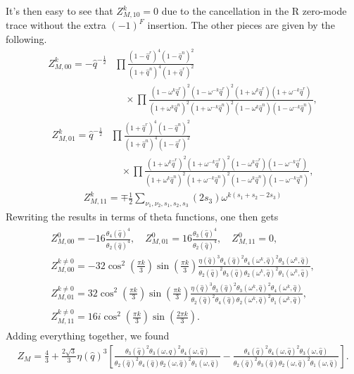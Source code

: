 \documentclass[12pt]{article}
\newcommand{\ie}{\begin{equation}\begin{aligned}}
\newcommand{\fe}{\end{aligned}\end{equation}}
\begin{document}
It's then easy to see that $Z_{M,10}^k=0$ due to the cancellation in the R zero-mode trace without the extra $(-1)^F$ insertion. The other pieces are given by the following.
\ie 
Z_{M,00}^k = -\hat{q}^{-\frac{1}{2}}&\prod \frac{(1-\hat{q}^r)^4(1-\hat{q}^n)^2}{(1+\hat{q}^n)^4(1+\hat{q}^r)^2}\\
&\quad \times \prod \frac{(1-\omega^k \hat{q}^r)^2(1-\omega^{-k} \hat{q}^r)^2(1+\omega^k \hat{q}^r)(1+\omega^{-k} \hat{q}^r)}{(1+\omega^k \hat{q}^n)^2(1+\omega^{-k} \hat{q}^n)^2(1-\omega^k \hat{q}^n)(1-\omega^{-k} \hat{q}^n)},
\fe
\ie
Z_{M,01}^k = \hat{q}^{-\frac{1}{2}}&\prod \frac{(1+\hat{q}^r)^4(1-\hat{q}^n)^2}{(1+\hat{q}^n)^4(1-\hat{q}^r)^2}\\
&\quad \times \prod \frac{(1+\omega^k \hat{q}^r)^2(1+\omega^{-k} \hat{q}^r)^2(1-\omega^k \hat{q}^r)(1-\omega^{-k} \hat{q}^r)}{(1+\omega^k \hat{q}^n)^2(1+\omega^{-k} \hat{q}^n)^2(1-\omega^k \hat{q}^n)(1-\omega^{-k} \hat{q}^n)},
\fe
\ie
Z_{M,11}^k = \mp\frac{1}{2}\sum_{\nu_1,\nu_2,s_1, s_2, s_3}(2s_3)\omega^{k(s_1+s_2-2s_3)}
\fe
Rewriting the results in terms of theta functions, one then gets
\ie \begin{gathered}
Z_{M,00}^0=-16\frac{\theta_4(\hat{q})^4}{\theta_2(\hat{q})^4},\quad Z_{M,01}^0 = 16 \frac{\theta_3(\hat{q})^4}{\theta_2(\hat{q})^4},\quad Z_{M,11}^0 = 0,\\
Z_{M,00}^{k\neq 0} = -32 \cos^2 (\tfrac{\pi k}{3})\sin (\tfrac{\pi k}{3}) \frac{\eta(\hat{q})^3\theta_4(\hat{q})^2\theta_4(\omega^k,\hat{q})^2\theta_3(\omega^k,\hat{q})}{\theta_2(\hat{q})^2\theta_3(\hat{q})\theta_2(\omega^k,\hat{q})^2\theta_1(\omega^k,\hat{q})},\\
Z_{M,01}^{k\neq 0} = 32 \cos^2 (\tfrac{\pi k}{3})\sin (\tfrac{\pi k}{3}) \frac{\eta(\hat{q})^3\theta_3(\hat{q})^2\theta_3(\omega^k,\hat{q})^2\theta_4(\omega^k,\hat{q})}{\theta_2(\hat{q})^2\theta_4(\hat{q})\theta_2(\omega^k,\hat{q})^2\theta_1(\omega^k,\hat{q})},\\
Z_{M,11}^{k\neq 0} = 16i \cos^2 (\tfrac{\pi k}{3})\sin(\tfrac{2\pi k}{3}).
\end{gathered}\fe
Adding everything together, we found
\ie \label{Zm}
Z_M = \frac{4}{3}+\frac{2\sqrt{3}}{3}\eta(\hat{q})^3\left[
\frac{\theta_3(\hat{q})^2\theta_3(\omega,\hat{q})^2\theta_4(\omega,\hat{q})}{\theta_2(\hat{q})^2\theta_4(\hat{q})\theta_2(\omega,\hat{q})^2\theta_1(\omega,\hat{q})}
-
\frac{\theta_4(\hat{q})^2\theta_4(\omega,\hat{q})^2\theta_3(\omega,\hat{q})}{\theta_2(\hat{q})^2\theta_3(\hat{q})\theta_2(\omega,\hat{q})^2\theta_1(\omega,\hat{q})}
\right].
\fe
\end{document}
